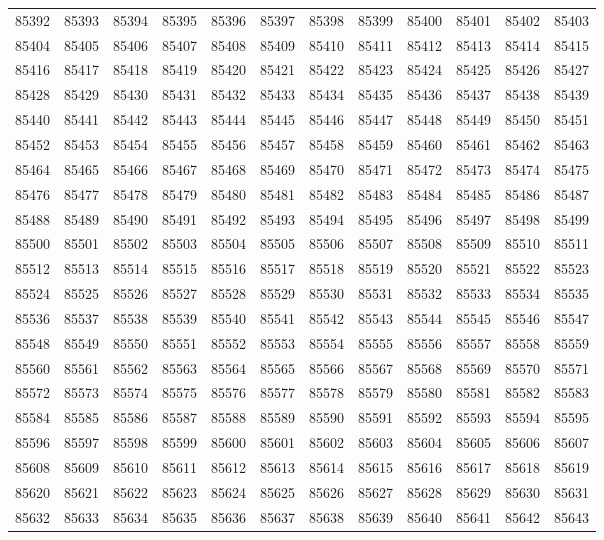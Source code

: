 \begin{center}
\begin{longtable}{llllllllllll}
85392 &85393 &85394 &85395 &85396 &85397 &85398 &85399 &85400 &85401 &85402 &85403 \\
85404 &85405 &85406 &85407 &85408 &85409 &85410 &85411 &85412 &85413 &85414 &85415 \\
85416 &85417 &85418 &85419 &85420 &85421 &85422 &85423 &85424 &85425 &85426 &85427 \\
85428 &85429 &85430 &85431 &85432 &85433 &85434 &85435 &85436 &85437 &85438 &85439 \\
85440 &85441 &85442 &85443 &85444 &85445 &85446 &85447 &85448 &85449 &85450 &85451 \\
85452 &85453 &85454 &85455 &85456 &85457 &85458 &85459 &85460 &85461 &85462 &85463 \\
85464 &85465 &85466 &85467 &85468 &85469 &85470 &85471 &85472 &85473 &85474 &85475 \\
85476 &85477 &85478 &85479 &85480 &85481 &85482 &85483 &85484 &85485 &85486 &85487 \\
85488 &85489 &85490 &85491 &85492 &85493 &85494 &85495 &85496 &85497 &85498 &85499 \\
85500 &85501 &85502 &85503 &85504 &85505 &85506 &85507 &85508 &85509 &85510 &85511 \\
85512 &85513 &85514 &85515 &85516 &85517 &85518 &85519 &85520 &85521 &85522 &85523 \\
85524 &85525 &85526 &85527 &85528 &85529 &85530 &85531 &85532 &85533 &85534 &85535 \\
85536 &85537 &85538 &85539 &85540 &85541 &85542 &85543 &85544 &85545 &85546 &85547 \\
85548 &85549 &85550 &85551 &85552 &85553 &85554 &85555 &85556 &85557 &85558 &85559 \\
85560 &85561 &85562 &85563 &85564 &85565 &85566 &85567 &85568 &85569 &85570 &85571 \\
85572 &85573 &85574 &85575 &85576 &85577 &85578 &85579 &85580 &85581 &85582 &85583 \\
85584 &85585 &85586 &85587 &85588 &85589 &85590 &85591 &85592 &85593 &85594 &85595 \\
85596 &85597 &85598 &85599 &85600 &85601 &85602 &85603 &85604 &85605 &85606 &85607 \\
85608 &85609 &85610 &85611 &85612 &85613 &85614 &85615 &85616 &85617 &85618 &85619 \\
85620 &85621 &85622 &85623 &85624 &85625 &85626 &85627 &85628 &85629 &85630 &85631 \\
85632 &85633 &85634 &85635 &85636 &85637 &85638 &85639 &85640 &85641 &85642 &85643 \\

\end{longtable}
\end{center}
